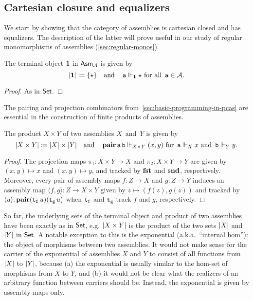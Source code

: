 \subsection{Cartesian closure and equalizers}
We start by showing that the category of assemblies is cartesian closed and has
equalizers. The description of the latter will prove useful in our study of
regular monomorphisms of assemblies (\cref{sec:regular-monos}).

\begin{proposition}
  The terminal object \(\mathbf 1\) in \(\mathsf{Asm}_{\mathcal A}\) is given by
  \[
    \lvert\mathbf 1\rvert \coloneq \{\star\}
    \quad
    \text{and}
    \quad
    \operatorname{\mathtt{a}} \Vdash_\mathbf 1 \star
    \text{ for all } \operatorname{\mathtt{a}} \in \mathcal A.
  \]
\end{proposition}
\begin{proof}
  As in \(\mathsf{Set}\).
\end{proof}

The pairing and projection combinators from~\cref{sec:basic-programming-in-pcas}
are essential in the construction of finite products of assemblies.

\begin{proposition}[Products]
  The product \(X \times Y\) of two assemblies \(X\)~and~\(Y\) is given by
  \[
    \lvert X \times Y\rvert \coloneq \lvert X\rvert \times \lvert Y\rvert
    \quad\text{and}\quad
    \operatorname{\mathbf{pair}}\operatorname{\mathtt{a}}\operatorname{\mathtt{b}} \Vdash_{X \times Y} (x,y)
    \text{ for }
    \operatorname{\mathtt{a}} \Vdash_X x
    \text{ and }
    \operatorname{\mathtt{b}} \Vdash_Y y.
  \]
\end{proposition}
\begin{proof}
  The projection maps \(\pi_1 \colon X \times Y \to X\) and
  \(\pi_2 \colon X \times Y \to Y\) are given by \((x,y) \mapsto x\) and
  \((x,y) \mapsto y\), and tracked by \(\operatorname{\mathbf{fst}}\) and \(\operatorname{\mathbf{snd}}\), respectively.
  Moreover, every pair of assembly maps \(f \colon Z \to X\) and
  \(g \colon Z \to Y\) induces an assembly map
  \(\langle f,g\rangle \colon Z \to X \times Y\) given by
  \(z \mapsto (f(z),g(z))\) and tracked by
  \(\langle{{u}}\rangle.\,{\operatorname{\mathbf{pair}}(\operatorname{\mathtt{t_f}}u)(\operatorname{\mathtt{t_g}}u)}\) when \(\operatorname{\mathtt{t_f}}\) and
  \(\operatorname{\mathtt{t_g}}\) track \(f\) and \(g\), respectively.
\end{proof}

So far, the underlying sets of the terminal object and product of two assemblies
have been exactly as in \(\mathsf{Set}\), e.g. \(\lvert X \times Y\rvert\) is the product
of the two sets \(\lvert X\rvert\) and \(\lvert Y\rvert\) in \(\mathsf{Set}\).
%
A notable exception to this is the exponential (a.k.a.\ ``internal hom''):
the object of morphisms between two assemblies.
%
It would not make sense for the carrier of the exponential of assemblies \(X\)
and \(Y\) to consist of all functions from \(\lvert X\rvert\) to \(\lvert Y\rvert\),
because (a) the exponential is usually similar to the hom-set of morphisms from
\(X\) to \(Y\), and (b) it would not be clear what the realizers of an arbitrary
function between carriers should be.
%
Instead, the exponential is given by assembly maps only.

